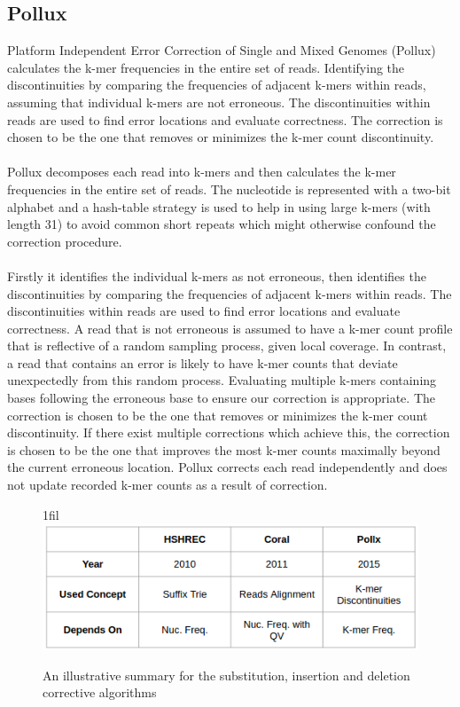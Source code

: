\documentclass[12pt,openany]{llncs}
\makeatletter
\newcommand*{\centerfloat}{%
  \parindent \z@
  \leftskip \z@ \@plus 1fil \@minus \textwidth
  \rightskip\leftskip
  \parfillskip \z@skip}
\makeatother
\begin{document}
\subsection{Pollux}
Platform Independent Error Correction of Single and Mixed Genomes (Pollux) \cite{Pollux} calculates the k-mer frequencies in the entire set of reads. Identifying the discontinuities by comparing the frequencies of adjacent k-mers within reads, assuming that individual k-mers are not erroneous. The discontinuities within reads are used to find error locations and evaluate correctness. The correction is chosen to be the one that removes or minimizes the k-mer count discontinuity.
\\
\\
Pollux decomposes each read into k-mers and then calculates the k-mer frequencies in the entire set of reads. The nucleotide is represented with a two-bit alphabet and a hash-table strategy is used to help in using large k-mers (with length 31) to avoid common short repeats which might otherwise confound the correction procedure.
\\
\\
Firstly it identifies the individual k-mers as not erroneous, then identifies the discontinuities by comparing the frequencies of adjacent k-mers within reads. The discontinuities within reads are used to find error locations and evaluate correctness. A read that is not erroneous is assumed to have a k-mer count profile that is reflective of a random sampling process, given local coverage. In contrast, a read that contains an error is likely to have k-mer counts that deviate unexpectedly from this random process. Evaluating multiple k-mers containing bases following the erroneous base to ensure our correction is appropriate. The correction is chosen to be the one that removes or minimizes the k-mer count discontinuity. If there exist multiple corrections which achieve this, the correction is chosen to be the one that improves the most k-mer counts maximally beyond the current erroneous location. Pollux corrects each read independently and does not update recorded k-mer counts as a result of correction.
 
\begin{figure}
	\centerfloat
	\includegraphics[width=1\linewidth]{./figs/RW-2}
	\caption{\label{fig:fig-RW-2}An illustrative summary for the substitution, insertion and deletion corrective algorithms}
\end{figure}
\end{document}
